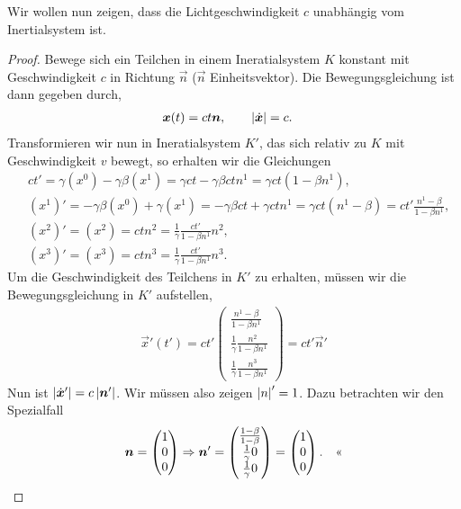 Wir wollen nun zeigen, dass die Lichtgeschwindigkeit $c$ unabhängig vom
Inertialsystem ist.
\begin{proof}
Bewege sich ein Teilchen in einem Ineratialsystem $K$ konstant mit
Geschwindigkeit $c$ in Richtung $\vec{n}$ ($\vec{n}$ Einheitsvektor). Die
Bewegungsgleichung ist dann gegeben durch,
\begin{align*}
&\vec{x}(t) = ct\vec{n},\qquad \abs{\dvec{x}} = c.
\end{align*} 
Transformieren wir nun in Ineratialsystem $K'$, das sich relativ zu $K$ mit
Geschwindigkeit $v$ bewegt, so erhalten wir die Gleichungen
\begin{align*}
&ct' = \gamma (x^0) -\gamma\beta (x^1) = \gamma ct - \gamma\beta ctn^1 = \gamma
ct(1-\beta n^1),\\
&(x^1)' = -\gamma\beta (x^0) + \gamma (x^1) = -\gamma\beta ct + \gamma ct n^1 =
\gamma ct(n^1-\beta) = ct'\frac{n^1-\beta}{1-\beta n^1},\\
&(x^2)' = (x^2) = ctn^2 = \frac{1}{\gamma}\frac{ct'}{1-\beta n^1}n^2,\\
&(x^3)' = (x^3) = ctn^3 = \frac{1}{\gamma}\frac{ct'}{1-\beta n^1}n^3.
\end{align*}
Um die Geschwindigkeit des Teilchens in $K'$ zu erhalten, müssen wir die
Bewegungsgleichung in $K'$ aufstellen,
\begin{align*}
\vec{x}'(t') = ct'
\begin{pmatrix}
\frac{n^1-\beta}{1-\beta n^1}\\
\frac{1}{\gamma}\frac{n^2}{1-\beta n^1}\\
\frac{1}{\gamma}\frac{n^3}{1-\beta n^1}
\end{pmatrix}
= ct'\vec{n}'
\end{align*}
Nun ist $\abs{\dvec{x}'} = c\abs{\vec{n}'}$. Wir müssen also zeigen $\abs{n}' =
1$. Dazu betrachten wir den Spezialfall
\begin{align*}
\vec{n} = 
\begin{pmatrix}
1 \\ 0\\ 0
\end{pmatrix}
\Rightarrow
\vec{n}' =
\begin{pmatrix}
\frac{1-\beta}{1-\beta}\\
\frac{1}{\gamma}0\\
\frac{1}{\gamma}0
\end{pmatrix}
= \begin{pmatrix}
  1 \\ 0\\ 0
  \end{pmatrix}.\qedhere
\end{align*}
\end{proof}

